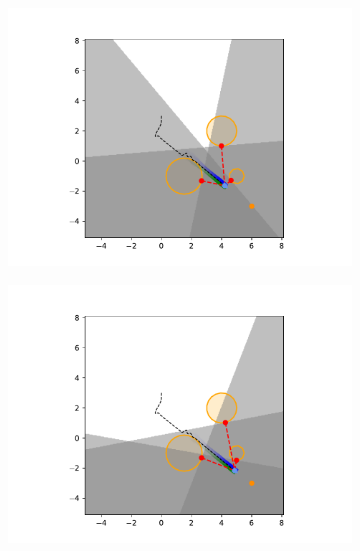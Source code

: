 \begin{figure}[h]
\begin{subfigure}{0.20\textwidth}
        \includegraphics[width=\textwidth]{figures/Simulations/sim1circles/frame_7.pdf}
    \end{subfigure}%
    \hfill
    \begin{subfigure}{0.20\textwidth}
        \centering
        \includegraphics[width=\textwidth]{figures/Simulations/sim1circles/frame_8.pdf}
    \end{subfigure}%
    \hfill
    \begin{subfigure}{0.20\textwidth}
        \centering

\end{subfigure}
\end{figure}
